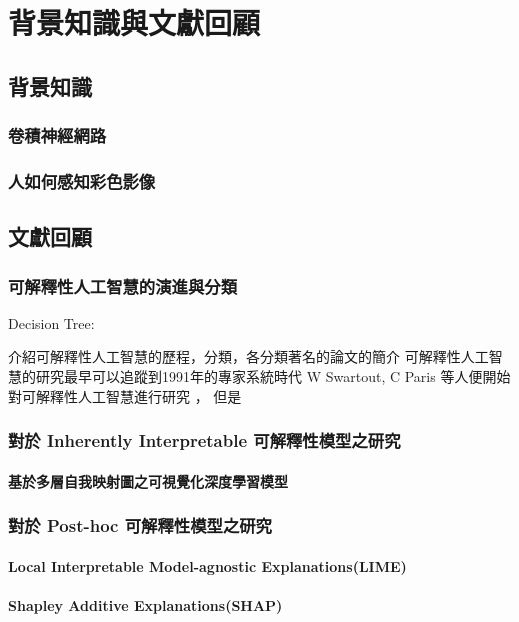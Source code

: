 \documentclass[class=NCU_thesis, crop=false]{standalone}
\begin{document}
\chapter{背景知識與文獻回顧}
\section{背景知識}
\subsection{卷積神經網路}




\subsection{人如何感知彩色影像}


\section{文獻回顧}

\subsection{可解釋性人工智慧的演進與分類}
Decision Tree:
\cite{rokach2016decision}
\cite{grinsztajn2022treebased}

介紹可解釋性人工智慧的歷程，分類，各分類著名的論文的簡介
可解釋性人工智慧的研究最早可以追蹤到1991年的專家系統時代 W Swartout, C Paris 等人便開始對可解釋性人工智慧進行研究 \cite{87686}，
但是

\subsection{對於 Inherently Interpretable 可解釋性模型之研究}
\subsubsection{基於多層自我映射圖之可視覺化深度學習模型}

\subsection{對於 Post-hoc 可解釋性模型之研究}
\subsubsection{Local Interpretable Model-agnostic Explanations(LIME)} 
\subsubsection{Shapley Additive Explanations(SHAP)}
\end{document}
